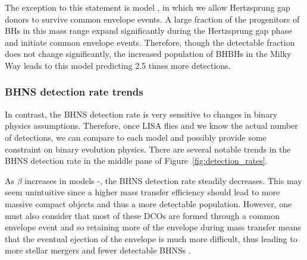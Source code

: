 The exception to this statement is model \modOpt{}, in which we allow Hertzsprung gap donors to survive common envelope events. A large fraction of the progenitors of BHs in this mass range expand significantly during the Hertzsprung gap phase and initiate common envelope events. Therefore, though the detectable fraction does not change significantly, the increased population of BHBHs in the Milky Way leads to this model predicting 2.5 times more detections.

\subsubsection{BHNS detection rate trends}
In contrast, the BHNS detection rate is very sensitive to changes in binary physics assumptions. Therefore, once LISA flies and we know the actual number of detections, we can compare to each model and possibly provide some constraint on binary evolution physics. There are several notable trends in the BHNS detection rate in the middle pane of Figure~\ref{fig:detection_rates}.

As $\beta$ increases in models \modBetaLow{}-\modBetaHigh{}, the BHNS detection rate steadily decreases. This may seem unintuitive since a higher mass transfer efficiency should lead to more massive compact objects and thus a more detectable population. However, one must also consider that most of these DCOs are formed through a common envelope event and so retaining more of the envelope during mass transfer means that the eventual ejection of the envelope is much more difficult, thus leading to more stellar mergers and fewer detectable BHNSs \citep[e.g.][]{Kruckow+2018}.


